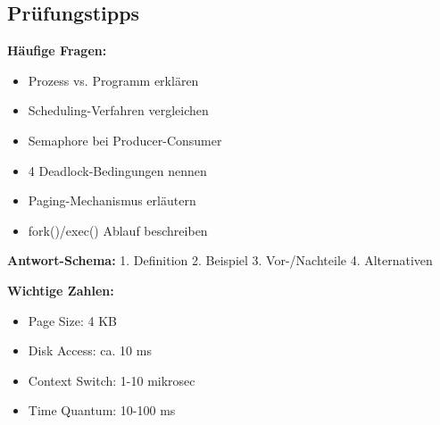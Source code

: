 \documentclass[10pt,a4paper]{article}
\begin{document}
\begin{multicols}{2}
\section{Prüfungstipps}
\textbf{Häufige Fragen:}
\begin{itemize}
\item Prozess vs. Programm erklären
\item Scheduling-Verfahren vergleichen
\item Semaphore bei Producer-Consumer
\item 4 Deadlock-Bedingungen nennen
\item Paging-Mechanismus erläutern
\item fork()/exec() Ablauf beschreiben
\end{itemize}

\textbf{Antwort-Schema:}
1. Definition 2. Beispiel 3. Vor-/Nachteile 4. Alternativen

\textbf{Wichtige Zahlen:}
\begin{itemize}
\item Page Size: 4 KB
\item Disk Access: ca. 10 ms
\item Context Switch: 1-10 mikrosec
\item Time Quantum: 10-100 ms
\end{itemize}

\end{multicols}
\end{document}
